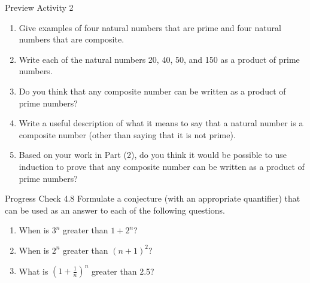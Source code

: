 \documentclass{beamer}
\begin{document}
\begin{frame}{Preview Activity 2}
    \begin{enumerate}
        \item Give examples of four natural numbers that are prime and four natural numbers
that are composite. \pause
        \item Write each of the natural numbers 20, 40, 50, and 150 as a product of prime
numbers. \pause
        \item Do you think that any composite number can be written as a product of prime
numbers? \pause
        \item Write a useful description of what it means to say that a natural number is a
composite number (other than saying that it is not prime). \pause
        \item Based on your work in Part (2), do you think it would be possible to use
induction to prove that any composite number can be written as a product of
prime numbers?
    \end{enumerate}
\end{frame}

\begin{frame}{Progress Check 4.8}
    Formulate a conjecture (with an appropriate quantifier) that can be used as an answer
to each of the following questions.
\begin{enumerate}
    \item When is $3^n$ greater than $1 + 2^n$?
    \item When is $2^n$ greater than $(n+1)^2$?
    \item What is $(1 + \frac{1}{n})^n$ greater than 2.5?
\end{enumerate}
\end{frame}
\end{document}
